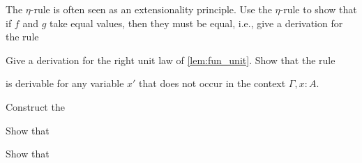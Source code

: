 \begin{exercises}
  \exercise \label{ex:eta_ext}The $\eta$-rule is often seen as an extensionality principle. Use the $\eta$-rule to show that if $f$ and $g$ take equal values, then they must be equal, i.e., give a derivation for the rule
  \begin{prooftree}
  \end{prooftree}
  \exercise \label{ex:fun_right_unit}Give a derivation for the right unit law of \cref{lem:fun_unit}.
  \exercise Show that the rule
  \begin{prooftree}
  \end{prooftree}
  is derivable for any variable $x'$ that does not occur in the context $\Gamma,x:A$.
  \exercise 
  \begin{subexenum}
  \item Construct the 
    \begin{prooftree}
    \end{prooftree}
  \item Show that
    \begin{prooftree}
    \end{prooftree}
  \item Show that
    \begin{prooftree}
    \end{prooftree}
  \end{subexenum}

\end{exercises}
